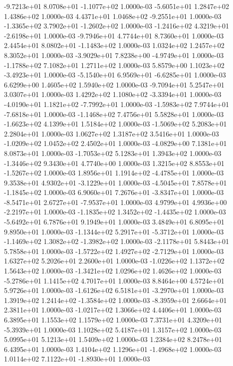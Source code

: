 -9.7213e+01  8.0708e+01 -1.1077e+02  1.0000e-03
-5.6051e+01  1.2847e+02  1.4386e+02  1.0000e-03
 4.4371e+01  1.0468e+02 -9.2551e+01  1.0000e-03
-1.3365e+02  3.7902e+01 -1.2602e+02  1.0000e-03
-1.2416e+02  4.3219e+01 -2.6198e+01  1.0000e-03
-9.7946e+01  4.7744e+01  8.7360e+01  1.0000e-03
 2.4454e+01  8.0802e+01 -1.1483e+02  1.0000e-03
1.0324e+02 1.2457e+02 8.3052e+01  1.0000e-03
-3.9029e+01  7.8238e+00 -4.9749e+01  1.0000e-03
-1.1788e+02  7.1082e+01  1.2711e+02  1.0000e-03
 5.8579e+00  1.1023e+02 -3.4923e+01  1.0000e-03
-5.1540e+01  6.9569e+01 -6.6285e+01  1.0000e-03
6.6299e+00 1.4605e+02 1.5940e+02  1.0000e-03
-9.7094e+01  5.2547e+01  3.0307e+01  1.0000e-03
 1.4292e+02  1.1080e+02 -3.3394e+01  1.0000e-03
-4.0190e+01  1.1821e+02 -7.7992e+01  1.0000e-03
-1.5983e+02  7.9744e+01 -7.6818e+01  1.0000e-03
-1.1468e+02  7.4756e+01  5.5828e+01  1.0000e-03
-1.6623e+02  4.1399e+01  1.5184e+02  1.0000e-03
-1.5069e+02  5.2083e+01  2.2804e+01  1.0000e-03
1.0627e+02 1.3187e+02 3.5416e+01  1.0000e-03
-1.0209e+02  1.0452e+02  2.4502e+01  1.0000e-03
-4.0829e+00  7.1381e+01  8.0873e+01  1.0000e-03
-1.7053e+02  5.1283e+01  1.3943e+02  1.0000e-03
-1.3446e+02  9.3430e+01  4.7740e+00  1.0000e-03
 1.3215e+02  8.8553e+01 -1.5267e+02  1.0000e-03
 1.8956e+01  1.1914e+02 -4.4785e+01  1.0000e-03
 9.3538e+01  4.9302e+01 -3.1229e+01  1.0000e-03
-4.5045e+01  7.8578e+01 -1.1845e+02  1.0000e-03
 6.9060e+01  7.2676e+01 -3.8347e+01  1.0000e-03
-8.5471e+01  2.6727e+01 -7.9537e+01  1.0000e-03
 4.9799e+01  4.9936e+00 -2.2197e+01  1.0000e-03
-1.1835e+02  1.3452e+02 -1.4435e+02  1.0000e-03
-5.6492e+01  6.7876e+01  9.1949e+01  1.0000e-03
3.4849e+01 6.8095e+01 9.8950e+01  1.0000e-03
-1.1344e+02  5.2917e+01 -5.3712e+01  1.0000e-03
-1.1469e+02  1.3082e+02 -1.3982e+02  1.0000e-03
-2.1178e+01  5.8443e+01  5.7858e+01  1.0000e-03
-1.5722e+02  1.4927e+02 -2.7129e+01  1.0000e-03
1.6327e+02 5.2026e+01 2.2600e+01  1.0000e-03
-1.0226e+02  1.1372e+02  1.5643e+02  1.0000e-03
-1.3421e+02  1.0296e+02  1.4626e+02  1.0000e-03
-5.2786e+01  1.1415e+02  4.7017e+01  1.0000e-03
8.8464e+00 4.5724e+01 5.9726e+01  1.0000e-03
-1.6126e+02  6.5181e+01 -3.2970e+01  1.0000e-03
 1.3919e+02  1.2414e+02 -1.3584e+02  1.0000e-03
-8.3959e+01  2.6664e+01  2.3811e+01  1.0000e-03
-1.0217e+02  1.3066e+02  4.4406e+01  1.0000e-03
6.3895e+01 1.1553e+02 1.1579e+02  1.0000e-03
 7.3731e+01  4.3209e+01 -5.3939e+01  1.0000e-03
1.1028e+02 5.4187e+01 1.3157e+02  1.0000e-03
5.0995e+01 5.1213e+01 1.5409e+02  1.0000e-03
1.2384e+02 8.2478e+01 6.4395e+01  1.0000e-03
 1.4104e+02  1.1296e+01 -1.4968e+02  1.0000e-03
 1.0114e+02  7.1122e+01 -1.8930e+01  1.0000e-03
